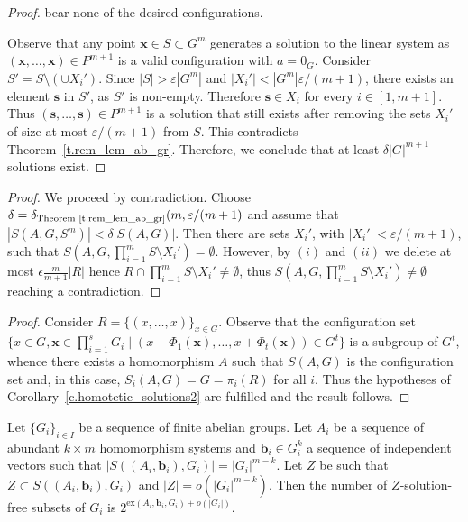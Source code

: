 \begin {proof}
bear none of the desired configurations. \par Observe that any point $\mathbf {x}\in S\subset G^m$ generates a solution to the linear system as $(\mathbf {x},\ldots ,\mathbf {x})\in P^{m+1}$ is a valid configuration with $a=0_{G}$. Consider $S'=S\setminus (\cup X_i')$. Since $|S|>\varepsilon |G^m|$ and $|X_i'|<|G^m|\varepsilon /(m+1)$, there exists an element $\mathbf {s}$ in $S'$, as $S'$ is non-empty. Therefore $\mathbf {s}\in X_i$ for every $i\in [1,m+1]$. Thus $(\mathbf {s},\ldots ,\mathbf {s})\in P^{m+1}$ is a solution that still exists after removing the sets $X_i'$ of size at most $\varepsilon /(m+1)$ from $S$. This contradicts Theorem~\ref {t.rem_lem_ab_gr}. Therefore, we conclude that at least $\delta |G|^{m+1}$ solutions exist.
 \end {proof} 
 
 \begin {proof} 
 We proceed by contradiction. Choose $\delta =\delta _{\text {Theorem~\ref {t.rem_lem_ab_gr}}}(m,\varepsilon /(m+1)$ and assume that $\left |S(A,G,S^m)\right |<\delta \left |S(A,G)\right |$. Then there are sets $X_i'$, with $|X_i'|< \varepsilon /(m+1)$, such that $S(A,G,\prod _{i=1}^m S\setminus X_i')=\emptyset $. However, by $(i)$ and $(ii)$ we delete at most $\epsilon \frac {m}{m+1}|R|$ hence $R\cap \prod _{i=1}^m S\setminus X_i'\neq \emptyset $, thus $S(A,G,\prod _{i=1}^m S\setminus X_i')\neq \emptyset $ reaching a contradiction.
 \end {proof} 
 
 \begin {proof} 
 Consider $R=\{(x,\ldots ,x)\}_{x\in G}$. Observe that the configuration set $\{x\in G, \mathbf {x}\in \prod _{i=1}^s G_i \;|\; (x+\Phi _1(\mathbf {x}), \ldots ,x+\Phi _t(\mathbf {x}))\in G^t\}$ is a subgroup of $G^t$, whence there exists a homomorphism $A$ such that $S(A,G)$ is the configuration set and, in this case, $S_i(A,G)=G=\pi _i(R)$ for all $i$. Thus the hypotheses of Corollary~\ref {c.homotetic_solutions2} are fulfilled and the result follows.
 \end {proof} 
 
 \begin {theorem} 
  \label {t.saxtom+} Let $\{G_i\}_{i\in I}$ be a sequence of finite abelian groups. Let $A_i$ be a sequence of abundant $k\times m$ homomorphism systems and $\mathbf {b}_i\in G_i^k$ a sequence of independent vectors such that $|S((A_i,\mathbf {b}_i),G_i)|=|G_i|^{m-k}$. Let $Z$ be such that $Z\subset S((A_i,\mathbf {b}_i),G_i)$ and $|Z|=o(|G_i|^{m-k})$. Then the number of $Z$-solution-free subsets of $G_i$ is $2^{\text {ex}(A_i,\mathbf {b}_i,G_i)+o(|G_i|)}$. 
 \end {theorem} 
 
